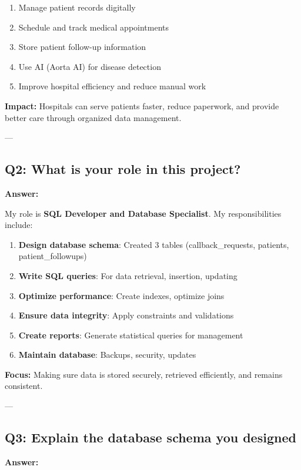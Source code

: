 \documentclass[12pt,a4paper]{article}
\begin{document}
\begin{enumerate}
    \item Manage patient records digitally
    \item Schedule and track medical appointments
    \item Store patient follow-up information
    \item Use AI (Aorta AI) for disease detection
    \item Improve hospital efficiency and reduce manual work
\end{enumerate}

\textbf{Impact:} Hospitals can serve patients faster, reduce paperwork, and provide better care through organized data management.

---

\subsection{Q2: What is your role in this project?}

\textbf{Answer:}

My role is \textbf{SQL Developer and Database Specialist}. My responsibilities include:

\begin{enumerate}
    \item \textbf{Design database schema}: Created 3 tables (callback\_requests, patients, patient\_followups)
    \item \textbf{Write SQL queries}: For data retrieval, insertion, updating
    \item \textbf{Optimize performance}: Create indexes, optimize joins
    \item \textbf{Ensure data integrity}: Apply constraints and validations
    \item \textbf{Create reports}: Generate statistical queries for management
    \item \textbf{Maintain database}: Backups, security, updates
\end{enumerate}

\textbf{Focus:} Making sure data is stored securely, retrieved efficiently, and remains consistent.

---

\subsection{Q3: Explain the database schema you designed}

\textbf{Answer:}
\end{document}
